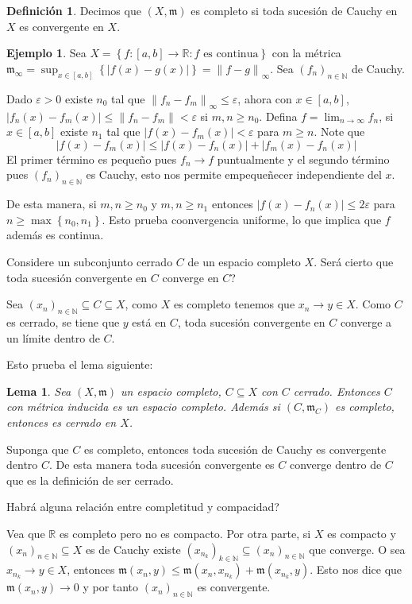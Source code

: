 \documentclass[12pt]{article}
\theoremstyle{plain}
\newtheorem{Lem}[Th]{Lema}             %
\theoremstyle{definition}
\newtheorem{Def}[Th]{Definición}       %
\newtheorem{Ex}[Th]{Ejemplo}               %
\theoremstyle{remark}
\numberwithin{equation}{section}
\newcommand{\bN}{\mathbb{N}}        %
\newcommand{\bR}{\mathbb{R}}        %
\newcommand{\mm}{\mathfrak{m}}      %
\renewcommand{\geq}{\geqslant}      %
\renewcommand{\leq}{\leqslant}      %
\renewcommand{\:}{\colon}           %
\newcommand{\conj}[1]{\left\lbrace#1\right\rbrace}
\newcommand{\bonj}[1]{\left\lbrack#1\right\rbrack}
\newcommand{\nm}[1]{\left\|#1\right\|} %
\begin{document}
\begin{multicols}{2}
\begin{Def}
  Decimos que $(X,\mm)$ es completo si toda sucesión de Cauchy en $X$ es convergente en $X$.
\end{Def}

\begin{Ex}
  Sea $X =\conj{f\colon\bonj{a,b}\to\bR\colon f\text{ es continua}}$ con la métrica $\mm_{\infty}=\sup_{x\in\bonj{a,b}}\conj{|f(x)-g(x)|}=\nm{f-g}_{\infty}$. Sea $(f_n)_{n\in\bN}$ de Cauchy. \par
  Dado $\varepsilon>0$ existe $n_0$ tal que $\nm{f_n-f_m}_{\infty}\leq\varepsilon$, ahora con $x\in\bonj{a,b}$, $|f_n(x)-f_m(x)|\leq \nm{f_n-f_m}<\varepsilon$ si $m,n\geq n_0$. Defina $f=\lim_{n\to\infty} f_n$, si $x\in\bonj{a,b}$ existe $n_1$ tal que $|f(x)-f_m(x)|<\varepsilon$ para $m\geq n$. Note que
  $$|f(x)-f_m(x)|\leq |f(x)-f_n(x)|+|f_m(x)-f_n(x)|$$
  El primer término es pequeño pues $f_n\to f$ puntualmente y el segundo término pues $(f_n)_{n\in\bN}$ es Cauchy, esto nos permite empequeñecer independiente del $x$. \par
  De esta manera, si $m,n\geq n_0$ y $m,n\geq n_1$ entonces $|f(x)-f_n(x)|\leq 2\varepsilon$ para $n\geq\max\conj{n_0,n_1}$. Esto prueba coonvergencia uniforme, lo que implica que $f$ además es continua.
\end{Ex}

Considere un subconjunto cerrado $C$ de un espacio completo $X$. Será cierto que toda sucesión convergente en $C$ converge en $C$?\par
Sea $(x_n)_{n\in\bN}\subseteq C\subseteq X$, como $X$ es completo tenemos que $x_n\to y\in X$. Como $C$ es cerrado, se tiene que $y$ está en $C$, toda sucesión convergente en $C$ converge a un límite dentro de $C$.\par
Esto prueba el lema siguiente:

\begin{Lem}
  Sea $(X,\mm)$ un espacio completo, $C\subseteq X$ con $C$ cerrado. Entonces $C$ con métrica inducida es un espacio completo. Además si $(C,\mm_C)$ es completo, entonces es cerrado en $X$.
\end{Lem}

\begin{ptcbp}
Suponga que $C$ es completo, entonces toda sucesión de Cauchy es convergente dentro $C$. De esta manera toda sucesión convergente es $C$ converge dentro de $C$ que es la definición de ser cerrado.
\end{ptcbp}

Habrá alguna relación entre completitud y compacidad?\par
Vea que $\bR$ es completo pero no es compacto. Por otra parte, si $X$ es compacto y $(x_n)_{n\in\bN}\subseteq X$ es de Cauchy existe $(x_{n_k})_{k\in\bN}\subseteq(x_n)_{n\in\bN}$ que converge. O sea $x_{n_k}\to y\in X$, entonces $\mm(x_n,y)\leq \mm(x_n,x_{n_k})+\mm(x_{n_k},y)$. Esto nos dice que $\mm(x_n,y)\to 0$ y por tanto $(x_n)_{n\in\bN}$ es convergente.


\end{multicols}
\end{document}
